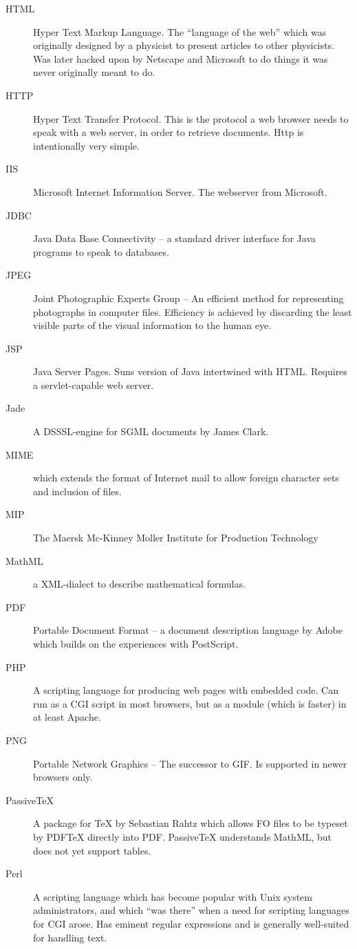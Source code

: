 \begin{description}
\item[HTML] Hyper Text Markup Language.  The ``language of the web'' which was originally designed by a physicist to present articles to other physicists.  Was later hacked upon by Netscape and Microsoft to do things it was never originally meant to do.
\item[HTTP] Hyper Text Transfer Protocol.  This is the protocol a web browser needs to speak with a web server, in order to retrieve documents.  Http is intentionally very simple.
\item[IIS] Microsoft Internet Information Server.  The webserver from
  Microsoft.
\item[JDBC] Java Data Base Connectivity -- a standard driver interface
for Java programs to speak to databases.

\item[JPEG] Joint Photographic Experts Group -- An efficient method for representing photographs in computer files.  Efficiency is achieved by discarding the least visible parts of the visual information to the human eye.
\item[JSP] Java Server Pages.  Suns version of Java intertwined with HTML.  Requires a servlet-capable web server.
\item[Jade] A DSSSL-engine for SGML documents by James Clark.
\item[MIME] {} which extends the format of Internet mail to allow foreign character sets and inclusion of files.
\item[MIP] The Maersk Mc-Kinney Moller Institute for Production Technology
\item[MathML] a XML-dialect to describe mathematical formulas.
\item[PDF] Portable Document Format -- a document description language by Adobe which builds on the experiences with PostScript.
\item[PHP] A scripting language for producing web pages with embedded code.  Can run as a CGI script in most browsers, but as a module (which is faster) in at least Apache.
\item[PNG] Portable Network Graphics -- The successor to GIF.  Is supported in newer browsers only.
\item[PassiveTeX] A package for {\TeX} by Sebastian Rahtz which allows FO files to be typeset by PDF{\TeX} directly into PDF.  PassiveTeX understands MathML, but does not yet support tables.
\item[Perl] A scripting language which has become popular with Unix system administrators, and which ``was there'' when a need for scripting languages for CGI arose.  Has eminent regular expressions and is generally well-suited for handling text.

\end{description}
